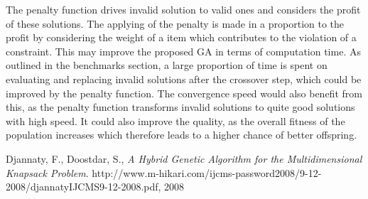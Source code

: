 \documentclass[a4paper]{article}
\begin{document}
The penalty function drives invalid solution to valid ones and considers the profit of these solutions. The applying of the penalty is made in a proportion to the profit by considering the weight of a item which contributes to the violation of a constraint. This may improve the proposed GA in terms of computation time. As outlined in the benchmarks section, a large proportion of time is spent on evaluating and replacing invalid solutions after the crossover step, which could be improved by the penalty function. The convergence speed would also benefit from this, as the penalty function transforms invalid solutions to quite good solutions with high speed. It could also improve the quality, as the overall fitness of the population increases which therefore leads to a higher chance of better offspring.


\begin{thebibliography}{9}

  Djannaty, F., Doostdar, S.,
  \emph{A Hybrid Genetic Algorithm
for the Multidimensional Knapsack Problem}.
  http://www.m-hikari.com/ijcms-password2008/9-12-2008/djannatyIJCMS9-12-2008.pdf,
  2008

\end{thebibliography}
\end{document}
